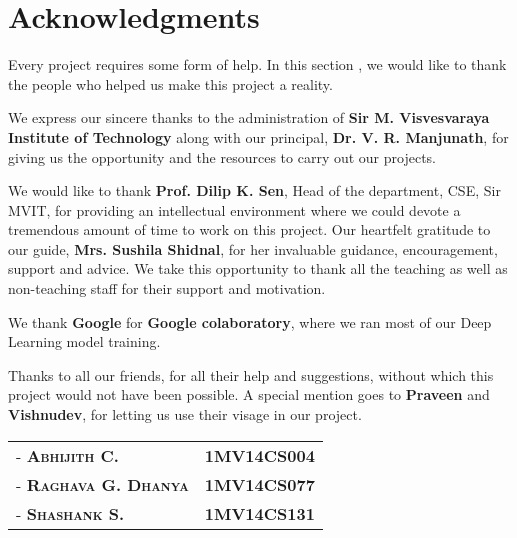 \chapter*{Acknowledgments}
\noindent Every project requires some form of help. In this section , we would like to thank the people who helped us make this project a reality.
\par\bigskip
We express our sincere thanks to the administration of \textbf{Sir M. Visvesvaraya Institute of Technology} along with our principal, \textbf{Dr. V. R. Manjunath}, for giving us the opportunity and the resources to carry out our projects.
\par\bigskip
We would like to thank \textbf{Prof. Dilip K. Sen}, Head of the department, CSE, Sir MVIT, for providing an intellectual environment where we could devote a tremendous amount of time to work on this project. Our heartfelt gratitude to our guide, \textbf{Mrs. Sushila Shidnal}, for her invaluable guidance, encouragement, support and advice. We take this opportunity to thank all the teaching as well as non-teaching staff for their support and motivation. 
\par\bigskip
We thank \textbf{Google} for \textbf{Google colaboratory}, where we ran most of our Deep Learning model training.
\par\bigskip
Thanks to all our friends, for all their help and suggestions, without which this project would not have been possible. A special mention goes to \textbf{Praveen} and \textbf{Vishnudev}, for letting us use their visage in our project.
\par\bigskip
\vspace{50px}
\noindent\hfill\begin{tabular}{ l r }
        \textsc{-  \textbf{Abhijith C.}}       &  \textbf{1MV14CS004} \\
        \textsc{-  \textbf{Raghava G. Dhanya}} &  \textbf{1MV14CS077} \\
        \textsc{-  \textbf{Shashank S.}}       &  \textbf{1MV14CS131}
\end{tabular}